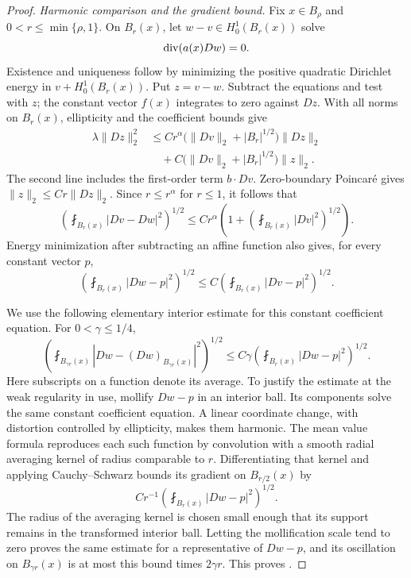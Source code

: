 \begin{proof}
\emph{Harmonic comparison and the gradient bound.}
Fix $x\in B_\rho$ and $0<r\le\min\{\rho,1\}$. On $B_r(x)$,
let $w-v\in H^1_0(B_r(x))$ solve
\[
 \operatorname{div}(a(x)Dw)=0.
\]
Existence and uniqueness follow by minimizing the positive quadratic
Dirichlet energy in $v+H^1_0(B_r(x))$. Put $z=v-w$. Subtract the
equations and test with $z$; the constant vector $f(x)$ integrates
to zero against $Dz$. With all norms on $B_r(x)$, ellipticity and
the coefficient bounds give
\[
 \begin{split}
 \lambda\|Dz\|_2^2
 &\le Cr^\alpha
      \bigl(\|Dv\|_2+|B_r|^{1/2}\bigr)\|Dz\|_2\\
 &\quad+C\bigl(\|Dv\|_2+|B_r|^{1/2}\bigr)\|z\|_2.
 \end{split}
\]
The second line includes the first-order term $b\cdot Dv$.
Zero-boundary Poincar\'e gives $\|z\|_2\le Cr\|Dz\|_2$.
Since $r\le r^\alpha$ for $r\le1$, it follows that
\begin{equation}
\label{eq:equality-frozen-comparison}
 \left(\fint_{B_r(x)}|Dv-Dw|^2\right)^{1/2}
 \le Cr^\alpha\left(
      1+\left(\fint_{B_r(x)}|Dv|^2\right)^{1/2}\right).
\end{equation}
Energy minimization after subtracting an affine function also gives,
for every constant vector $p$,
\begin{equation}
\label{eq:equality-harmonic-energy}
 \left(\fint_{B_r(x)}|Dw-p|^2\right)^{1/2}
 \le C\left(\fint_{B_r(x)}|Dv-p|^2\right)^{1/2}.
\end{equation}

We use the following elementary interior estimate for this constant
coefficient equation. For $0<\gamma\le1/4$,
\begin{equation}
\label{eq:equality-harmonic-oscillation}
 \left(\fint_{B_{\gamma r}(x)}
       |Dw-(Dw)_{B_{\gamma r}(x)}|^2\right)^{1/2}
 \le C\gamma
       \left(\fint_{B_r(x)}|Dw-p|^2\right)^{1/2}.
\end{equation}
Here subscripts on a function denote its average. To justify the
estimate at the weak regularity in use, mollify $Dw-p$ in an
interior ball. Its components solve the same constant coefficient
equation. A linear coordinate change, with distortion controlled by
ellipticity, makes them harmonic. The mean value formula reproduces
each such function by convolution with a smooth radial averaging
kernel of radius comparable to $r$. Differentiating that kernel
and applying Cauchy--Schwarz bounds its gradient on $B_{r/2}(x)$ by
\[
 Cr^{-1}\left(\fint_{B_r(x)}|Dw-p|^2\right)^{1/2}.
\]
The radius of the averaging kernel is chosen small enough that its
support remains in the transformed interior ball. Letting the
mollification scale tend to zero proves the same estimate for a
representative of $Dw-p$, and its oscillation on $B_{\gamma r}(x)$
is at most this bound times $2\gamma r$. This proves
.


\end{proof}
